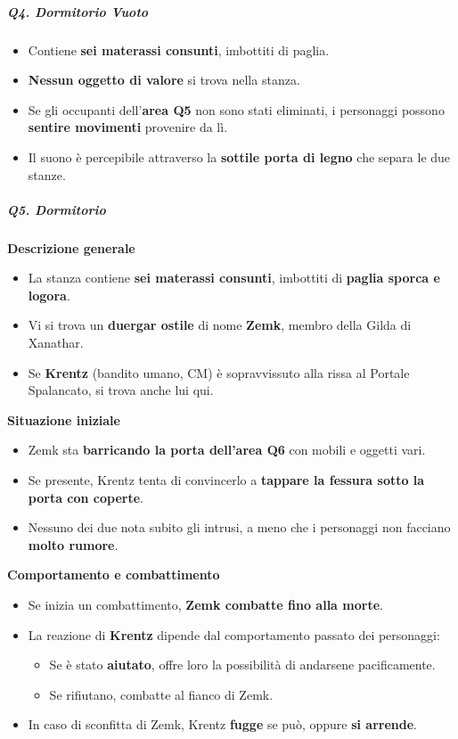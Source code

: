 \documentclass{article}
\begin{document}
\subparagraph{Q4. Dormitorio Vuoto}
\begin{itemize}
    \item Contiene \textbf{sei materassi consunti}, imbottiti di paglia.
    \item \textbf{Nessun oggetto di valore} si trova nella stanza.
    \item Se gli occupanti dell’\textbf{area Q5} non sono stati eliminati, i personaggi possono \textbf{sentire movimenti} provenire da lì.
    \item Il suono è percepibile attraverso la \textbf{sottile porta di legno} che separa le due stanze.
\end{itemize}

\subparagraph{Q5. Dormitorio}
\textbf{Descrizione generale}
\begin{itemize}
    \item La stanza contiene \textbf{sei materassi consunti}, imbottiti di \textbf{paglia sporca e logora}.
    \item Vi si trova un \textbf{duergar ostile} di nome \textbf{Zemk}, membro della Gilda di Xanathar.
    \item Se \textbf{Krentz} (bandito umano, CM) è sopravvissuto alla rissa al Portale Spalancato, si trova anche lui qui.
\end{itemize}

\textbf{Situazione iniziale}
\begin{itemize}
    \item Zemk sta \textbf{barricando la porta dell’area Q6} con mobili e oggetti vari.
    \item Se presente, Krentz tenta di convincerlo a \textbf{tappare la fessura sotto la porta con coperte}.
    \item Nessuno dei due nota subito gli intrusi, a meno che i personaggi non facciano \textbf{molto rumore}.
\end{itemize}

\textbf{Comportamento e combattimento}
\begin{itemize}
    \item Se inizia un combattimento, \textbf{Zemk combatte fino alla morte}.
    \item La reazione di \textbf{Krentz} dipende dal comportamento passato dei personaggi:
    \begin{itemize}
        \item Se è stato \textbf{aiutato}, offre loro la possibilità di andarsene pacificamente.
        \item Se rifiutano, combatte al fianco di Zemk.
    \end{itemize}
    \item In caso di sconfitta di Zemk, Krentz \textbf{fugge} se può, oppure \textbf{si arrende}.
\end{itemize}
\end{document}
